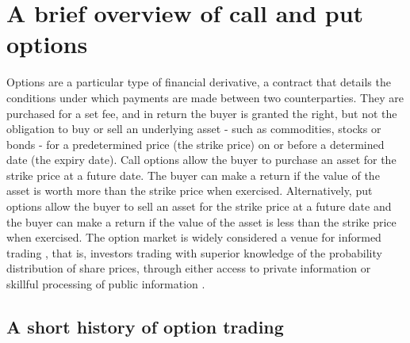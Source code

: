 \section{A brief overview of call and put options}

Options are a particular type of financial derivative, a contract that details the conditions under which payments are made between two counterparties. They are purchased for a set fee, and in return the buyer is granted the right, but not the obligation to buy or sell an underlying asset - such as commodities, stocks or bonds - for a predetermined price (the strike price) on or before a determined date (the expiry date).
\nline
Call options allow the buyer to purchase an asset for the strike price at a future date. The buyer can make a return if the value of the asset is worth more than the strike price when exercised. Alternatively, put options allow the buyer to sell an asset for the strike price at a future date and the buyer can make a return if the value of the asset is less than the strike price when exercised.
\nline
The option market is widely considered a venue for informed trading \cite{li2021effect,hu2014,chak2004}, that is, investors trading with superior knowledge of the probability distribution of share prices, through either access to private information or skillful processing of public information \cite{grossman1975application}. 

\subsection{A short history of option trading}

